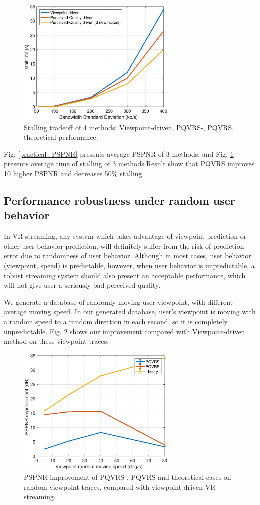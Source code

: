    \begin{figure}
  \centering
  \includegraphics[width=3in]{images/throughput-stalltime.eps}
  \caption{Stalling tradeoff of 4 methods: Viewpoint-driven, PQVRS-, PQVRS, theoretical performance.}
  \label{practical_stall}
  \end{figure}

Fig. \ref{practical_PSPNR} presents average PSPNR of 3 methods, and Fig. \ref{practical_stall} presents average time of stalling of 3 methods.Result show that PQVRS improves 10 higher PSPNR and decreases 50\% stalling.

\subsection{Performance robustness under random user behavior}

In VR streaming, any system which takes advantage of viewpoint prediction or other user behavior prediction, will definitely suffer from the risk of prediction error due to randomness of user behavior. Although in most cases, user behavior (viewpoint, speed) is predictable, however, when user behavior is unpredictable, a robust streaming system should also present an acceptable performance, which will not give user a seriously bad perceived quality.

We generate a database of randomly moving user viewpoint, with different average moving speed. In our generated database, user's viewpoint is moving with a random speed to a random direction in each second, so it is completely unpredictable. Fig. \ref{random_improvement} shows our improvement compared with Viewpoint-driven method on these viewpoint traces.

    \begin{figure}
  \centering
  \includegraphics[width=3in]{images/random_improvement.eps}
  \caption{PSPNR improvement of PQVRS-, PQVRS and theoretical cases on random viewpoint traces, compared with viewpoint-driven VR streaming.}
  \label{random_improvement}
  \end{figure}

